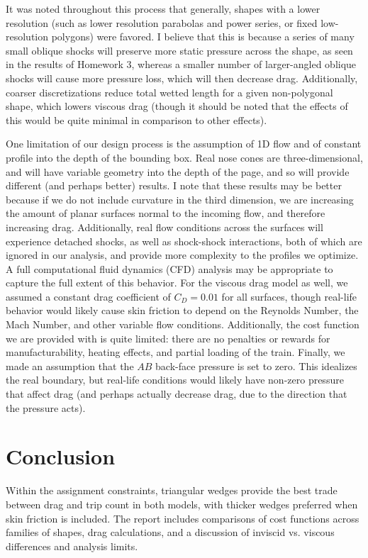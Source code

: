 \documentclass[11pt]{article}
\begin{document}
It was noted throughout this process that generally, shapes with a lower resolution (such as lower resolution parabolas and power series, or fixed low-resolution polygons) were favored. I believe that this is because a series of many small oblique shocks will preserve more static pressure across the shape, as seen in the results of Homework 3, whereas a smaller number of larger-angled oblique shocks will cause more pressure loss, which will then decrease drag. Additionally, coarser discretizations reduce total wetted length for a given non-polygonal shape, which lowers viscous drag (though it should be noted that the effects of this would be quite minimal in comparison to other effects).

One limitation of our design process is the assumption of 1D flow and of constant profile into the depth of the bounding box. Real nose cones are three-dimensional, and will have variable geometry into the depth of the page, and so will provide different (and perhaps better) results. I note that these results may be better because if we do not include curvature in the third dimension, we are increasing the amount of planar surfaces normal to the incoming flow, and therefore increasing drag. Additionally, real flow conditions across the surfaces will experience detached shocks, as well as shock-shock interactions, both of which are ignored in our analysis, and provide more complexity to the profiles we optimize. A full computational fluid dynamics (CFD) analysis may be appropriate to capture the full extent of this behavior. For the viscous drag model as well, we assumed a constant drag coefficient of $C_D = 0.01$ for all surfaces, though real-life behavior would likely cause skin friction to depend on the Reynolds Number, the Mach Number, and other variable flow conditions. Additionally, the cost function we are provided with is quite limited: there are no penalties or rewards for manufacturability, heating effects, and partial loading of the train. Finally, we made an assumption that the $AB$ back-face pressure is set to zero. This idealizes the real boundary, but real-life conditions would likely have non-zero pressure that affect drag (and perhaps actually decrease drag, due to the direction that the pressure acts).

\section{Conclusion}
Within the assignment constraints, triangular wedges provide the best trade between drag and trip count in both models, with thicker wedges preferred when skin friction is included. The report includes comparisons of cost functions across families of shapes, drag calculations, and a discussion of inviscid vs. viscous differences and analysis limits.

\printbibliography
\end{document}
